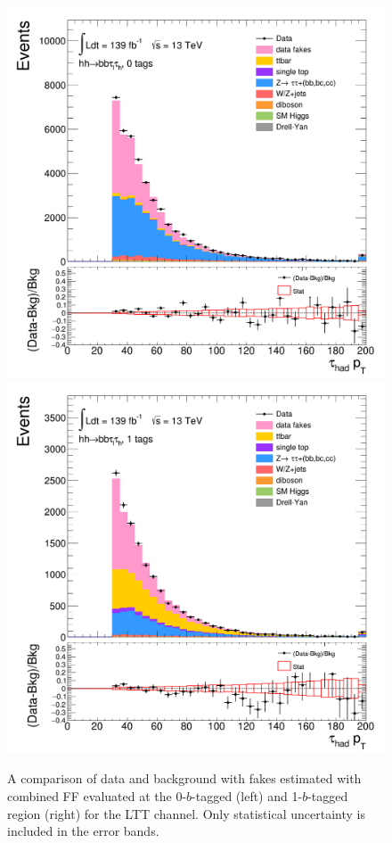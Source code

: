 \begin{figure}[htbp]
\centering
\includegraphics[width=.4\textwidth]{DiHiggs/plots/FF_CRs/SR_LTT_datafakes/HNone/BDTVarsHighMbb/0/C_0tag2pjet_0ptv_TauPt.png}
\includegraphics[width=.4\textwidth]{DiHiggs/plots/FF_CRs/SR_LTT_datafakes/HNone/BDTVarsHighMbb/1/C_1tag2pjet_0ptv_TauPt.png} \\
\caption{A comparison of data and background with fakes estimated with combined FF evaluated at the 0-$b$-tagged (left) 
and 1-$b$-tagged region (right) for the LTT channel.
Only statistical uncertainty is included in the error bands.  }
\label{fig:FFVRLTT}
\end{figure}









